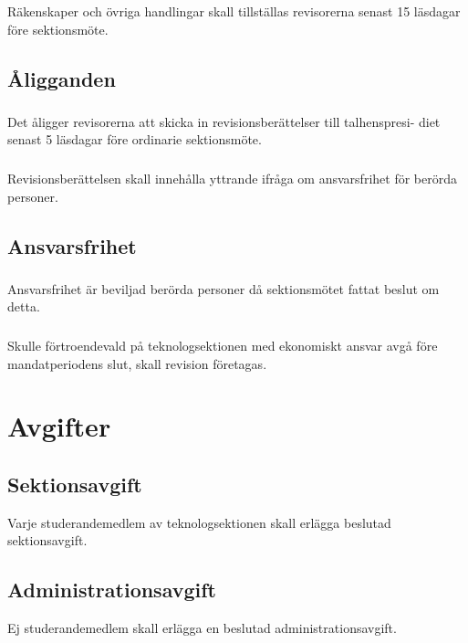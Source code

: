\documentclass[a4paper]{dtek}
\begin{document}
\subsubsection{}
Räkenskaper och övriga handlingar skall tillställas revisorerna senast 15 läsdagar före sektionsmöte.
\subsection{Åligganden}
\subsubsection{}
Det åligger revisorerna att skicka in revisionsberättelser till talhenspresi-
diet senast 5 läsdagar före ordinarie sektionsmöte.
\subsubsection{}
Revisionsberättelsen skall innehålla yttrande ifråga om ansvarsfrihet för berörda personer.
\subsection{Ansvarsfrihet}
\subsubsection{}
Ansvarsfrihet är beviljad berörda personer då sektionsmötet fattat beslut om detta.
\subsubsection{}
Skulle förtroendevald på teknologsektionen med ekonomiskt ansvar avgå före mandatperiodens slut, skall revision företagas.
\newpage

\section{Avgifter}
\subsection{Sektionsavgift}
Varje studerandemedlem av teknologsektionen skall erlägga beslutad sektionsavgift.
\subsection{Administrationsavgift}
Ej studerandemedlem skall erlägga en beslutad administrationsavgift.
\newpage
\end{document}

